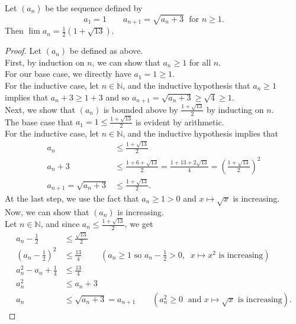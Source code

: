 \documentclass{article}
\newenvironment{theorem}[1]{\renewcommand\theinnercustomthm{#1}\innercustomthm}
  {\endinnercustomthm}
\begin{document}
\begin{theorem}{2}
    Let $(a_n)$ be the sequence defined by
    \[a_1 = 1 \qquad a_{n+1} = \sqrt{a_n + 3} \;\text{ for }n\ge1.\]
    Then $\lim a_n = \frac{1}{2}\left(1+\sqrt{13}\right)$.
\end{theorem}
\begin{proof}
    Let $(a_n)$ be defined as above. \\
    First, by induction on $n$, we can show that $a_n \ge 1$ for all $n$. \\
    For our base case, we directly have $a_1 = 1 \ge 1$. \\
    For the inductive case, let $n \in \mathbb N$, and the inductive hypothesis that $a_n \ge 1$ implies that $a_n + 3 \ge 1+3$ and so $a_{n+1} = \sqrt{a_n + 3} \ge \sqrt{4} \ge 1$. \\
    Next, we show that $(a_n)$ is bounded above by $\frac{1+\sqrt{13}}{2}$ by inducting on $n$. \\
    The base case that $a_1 = 1 \le \frac{1+\sqrt{13}}{2}$ is evident by arithmetic. \\
    For the inductive case, let $n \in \mathbb N$, and the inductive hypothesis implies that
    \begin{align*}
        a_n &\le \frac{1+\sqrt{13}}{2} \\
        a_n+3 &\le \frac{1+6+\sqrt{13}}{2} = \frac{1+13+2\sqrt{13}}{4} = \left(\frac{1+\sqrt{13}}{2}\right)^2 \\
        a_{n+1} = \sqrt{a_n + 3} &\le \frac{1+\sqrt{13}}{2}.
    \end{align*}
    At the last step, we use the fact that $a_n \ge 1 > 0$ and $x \mapsto \sqrt{x}$ is increasing. \\ 
    Now, we can show that $(a_n)$ is increasing. \\
    Let $n \in \mathbb N$, and since $a_n \le \frac{1+\sqrt{13}}{2}$, we get
    \begin{align*}
        a_n - \frac{1}{2} &\le \frac{\sqrt{13}}{2} \\
        \left(a_n-\frac{1}{2}\right)^2 &\le  \frac{13}{4} \qquad\; (a_n \ge 1 \text{ so } a_n - \frac{1}{2} > 0, \;\; x\mapsto x^2 \text{ is increasing}) \\
        a_n^2 -a_n + \frac{1}{4} &\le \frac{13}{4} \\
        a_n^2 &\le a_n + 3 \\
        a_n &\le \sqrt{a_n+3} = a_{n+1} \qquad (a_n^2 \ge 0 \;\text{ and } x \mapsto \sqrt{x} \text{ is increasing}).
    \end{align*}

\end{proof}
\end{document}
